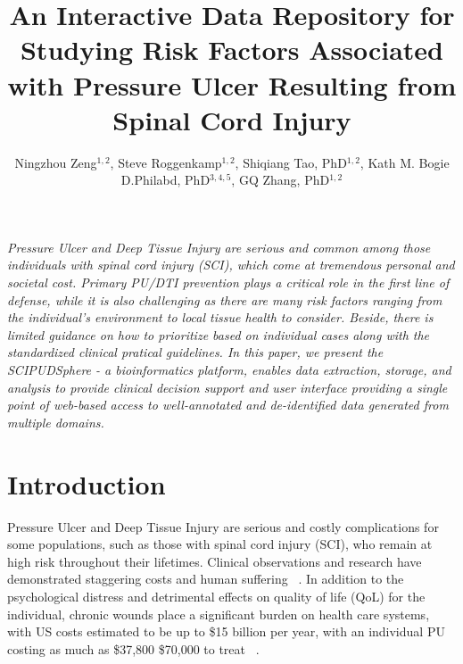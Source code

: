\documentclass{amia}
\begin{document}
\title{An Interactive Data Repository for Studying Risk Factors Associated with Pressure Ulcer Resulting from Spinal Cord Injury}

\author{Ningzhou Zeng$^{1,2}$, Steve Roggenkamp$^{1,2}$, Shiqiang Tao, PhD$^{1,2}$, Kath M. Bogie D.Philabd, PhD$^{3,4,5}$, GQ Zhang, PhD$^{1,2}$}


\maketitle


\textit{Pressure Ulcer and Deep Tissue Injury are serious and common among those individuals with spinal cord injury (SCI), which come at tremendous personal and societal cost. Primary PU/DTI prevention plays a critical role in the first line of defense, while it is also challenging as there are many risk factors ranging from the individual’s environment to local tissue health to consider. Beside, there is limited guidance on how to prioritize based on individual cases along with the standardized clinical pratical guidelines. In this paper, we present the SCIPUDSphere - a bioinformatics platform, enables data extraction, storage, and analysis to provide clinical decision support and user interface providing a single point of web-based access to well-annotated and de-identified data generated from multiple domains. }

\section{Introduction}
Pressure Ulcer and Deep Tissue Injury are serious and costly complications for some populations, such as those with spinal cord injury (SCI), who remain at high risk throughout their lifetimes. Clinical observations and research have demonstrated staggering costs and human suffering ~\cite{ref1,ref2,ref3}. In addition to the psychological distress and detrimental effects on quality of life (QoL) for the individual, chronic wounds place a significant burden on health care systems, with US costs estimated to be up to \$15 billion per year, with an individual PU costing as much as \$37,800 \- \$70,000 to treat  ~\cite{ref4,ref5,ref6}.
\end{document}
